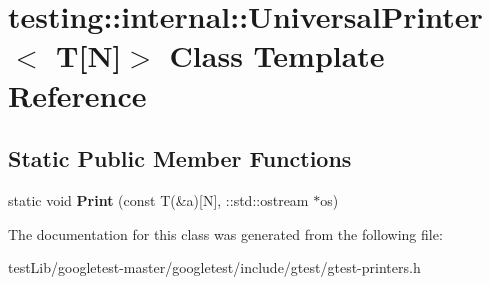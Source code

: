\hypertarget{classtesting_1_1internal_1_1UniversalPrinter_3_01T[N]_4}{}\section{testing\+:\+:internal\+:\+:Universal\+Printer$<$ T\mbox{[}N\mbox{]}$>$ Class Template Reference}
\label{classtesting_1_1internal_1_1UniversalPrinter_3_01T[N]_4}
\subsection*{Static Public Member Functions}
\begin{DoxyCompactItemize}
\item 
\mbox{\label{classtesting_1_1internal_1_1UniversalPrinter_3_01T[N]_4_a1cf0e7c8db59c090f769116c6421b212}} 
static void {\bfseries Print} (const T(\&a)\mbox{[}N\mbox{]}, \+::std\+::ostream $\ast$os)
\end{DoxyCompactItemize}


The documentation for this class was generated from the following file\+:\begin{DoxyCompactItemize}
\item 
test\+Lib/googletest-\/master/googletest/include/gtest/gtest-\/printers.\+h\end{DoxyCompactItemize}
